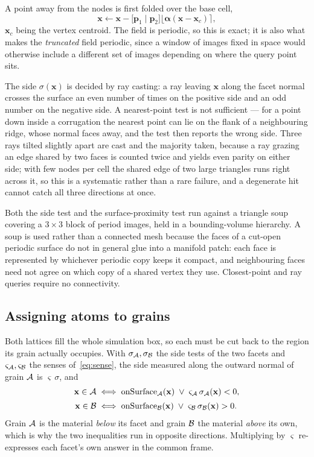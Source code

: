 A point away from the nodes is first folded over the base cell,
\begin{equation}
  \mathbf{x} \leftarrow \mathbf{x}
    - \bigl[\mathbf{p}_1 \mid \mathbf{p}_2\bigr]
      \bigl\lfloor \boldsymbol{\alpha}(\mathbf{x}-\mathbf{x}_c) \bigr\rceil ,
  \label{eq:fold}
\end{equation}
$\mathbf{x}_c$ being the vertex centroid. The field is periodic, so this is
exact; it is also what makes the \emph{truncated} field periodic, since a window
of images fixed in space would otherwise include a different set of images
depending on where the query point sits.

The side $\sigma(\mathbf{x})$ is decided by ray casting: a ray leaving
$\mathbf{x}$ along the facet normal crosses the surface an even number of times
on the positive side and an odd number on the negative side. A nearest-point
test is not sufficient --- for a point down inside a corrugation the nearest
point can lie on the flank of a neighbouring ridge, whose normal faces away, and
the test then reports the wrong side. Three rays tilted slightly apart are cast
and the majority taken, because a ray grazing an edge shared by two faces is
counted twice and yields even parity on either side; with few nodes per cell the
shared edge of two large triangles runs right across it, so this is a systematic
rather than a rare failure, and a degenerate hit cannot catch all three
directions at once.

Both the side test and the surface-proximity test run against a triangle soup
covering a $3\times3$ block of period images, held in a bounding-volume
hierarchy. A soup is used rather than a connected mesh because the faces of a
cut-open periodic surface do not in general glue into a manifold patch: each
face is represented by whichever periodic copy keeps it compact, and
neighbouring faces need not agree on which copy of a shared vertex they use.
Closest-point and ray queries require no connectivity.

\subsection*{Assigning atoms to grains}

Both lattices fill the whole simulation box, so each must be cut back to the
region its grain actually occupies. With $\sigma_{\mathcal{A}}, \sigma_{\mathcal{B}}$ the side
tests of the two facets and $\varsigma_{\mathcal{A}}, \varsigma_{\mathcal{B}}$ the senses
of~\eqref{eq:sense}, the side measured along the outward normal of grain $\mathcal{A}$ is
$\varsigma\,\sigma$, and
\begin{align}
  \mathbf{x} \in \mathcal{A}
  &\iff
  \text{onSurface}_{\mathcal{A}}(\mathbf{x})
  \;\lor\; \varsigma_{\mathcal{A}}\,\sigma_{\mathcal{A}}(\mathbf{x}) < 0 ,
  \label{eq:ingrainA}\\[2pt]
  \mathbf{x} \in \mathcal{B}
  &\iff
  \text{onSurface}_{\mathcal{B}}(\mathbf{x})
  \;\lor\; \varsigma_{\mathcal{B}}\,\sigma_{\mathcal{B}}(\mathbf{x}) > 0 .
  \label{eq:ingrainB}
\end{align}
Grain $\mathcal{A}$ is the material \emph{below} its facet and grain $\mathcal{B}$ the material
\emph{above} its own, which is why the two inequalities run in opposite
directions. Multiplying by $\varsigma$ re-expresses each facet's own answer in
the common frame.

